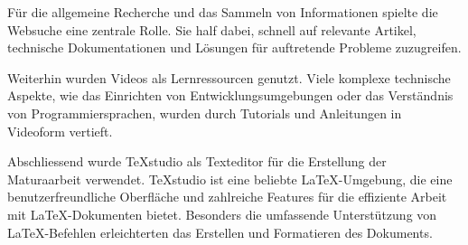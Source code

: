 Für die allgemeine Recherche und das Sammeln von Informationen spielte die Websuche eine zentrale Rolle. Sie half dabei, schnell auf relevante Artikel, technische Dokumentationen und Lösungen für auftretende Probleme zuzugreifen.

Weiterhin wurden Videos als Lernressourcen genutzt. Viele komplexe technische Aspekte, wie das Einrichten von Entwicklungsumgebungen oder das Verständnis von Programmiersprachen, wurden durch Tutorials und Anleitungen in Videoform vertieft.

Abschliessend wurde TeXstudio\cite{texstudio} als Texteditor für die Erstellung der Maturaarbeit verwendet. TeXstudio ist eine beliebte LaTeX-Umgebung, die eine benutzerfreundliche Oberfläche und zahlreiche Features für die effiziente Arbeit mit LaTeX-Dokumenten bietet. Besonders die umfassende Unterstützung von LaTeX-Befehlen erleichterten das Erstellen und Formatieren des Dokuments.




